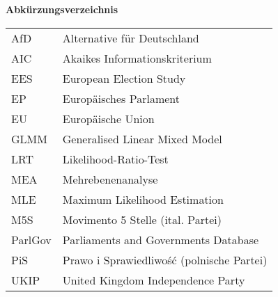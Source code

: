 \vspace{1cm}
\noindent\textbf{\Large Abkürzungsverzeichnis}
\vspace{5mm}
\begin{tabular}{ll}
AfD & Alternative für Deutschland \\
AIC & Akaikes Informationskriterium \\
EES & European Election Study \\
EP & Europäisches Parlament \\
EU & Europäische Union \\
GLMM & Generalised Linear Mixed Model \\
LRT & Likelihood-Ratio-Test \\
MEA & Mehrebenenanalyse \\
MLE & Maximum Likelihood Estimation \\
M5S & Movimento 5 Stelle (ital. Partei) \\
ParlGov & Parliaments and Governments Database \\
PiS & Prawo i Sprawiedliwość (polnische Partei) \\
UKIP & United Kingdom Independence Party \\
\end{tabular}

